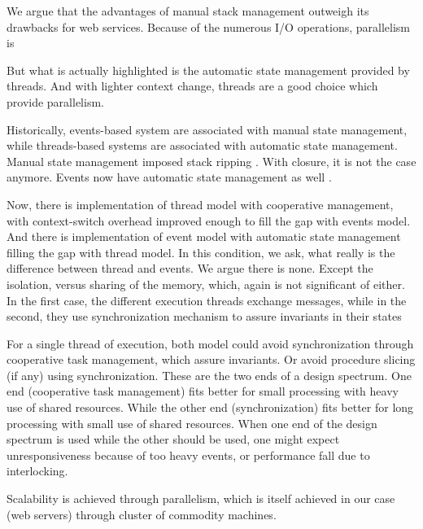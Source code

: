 We argue that the advantages of manual stack management outweigh its drawbacks for web services.
Because of the numerous I/O operations, parallelism is 






But what is actually highlighted is the automatic state management provided by threads.
And with lighter context change, threads are a good choice which provide parallelism.

Historically, events-based system are associated with manual state management, while threads-based systems are associated with automatic state management.
Manual state management imposed stack ripping \cite{Adya2002}.
With closure, it is not the case anymore.
Events now have automatic state management as well \cite{Krohn2007}.

Now, there is implementation of thread model with cooperative management, with context-switch overhead improved enough to fill the gap with events model.
And there is implementation of event model with automatic state management filling the gap with thread model.
In this condition, we ask, what really is the difference between thread and events.
We argue there is none.
Except the isolation, versus sharing of the memory, which, again is not significant of either.
In the first case, the different execution threads exchange messages, while in the second, they use synchronization mechanism to assure invariants in their states %

For a single thread of execution, both model could avoid synchronization through cooperative task management, which assure invariants. %
Or avoid procedure slicing (if any) using synchronization.
These are the two ends of a design spectrum.
One end (cooperative task management) fits better for small processing with heavy use of shared resources.
While the other end (synchronization) fits better for long processing with small use of shared resources.
When one end of the design spectrum is used while the other should be used, one might expect unresponsiveness because of too heavy events, or performance fall due to interlocking.

Scalability is achieved through parallelism, which is itself achieved in our case (web servers) through cluster of commodity machines.

